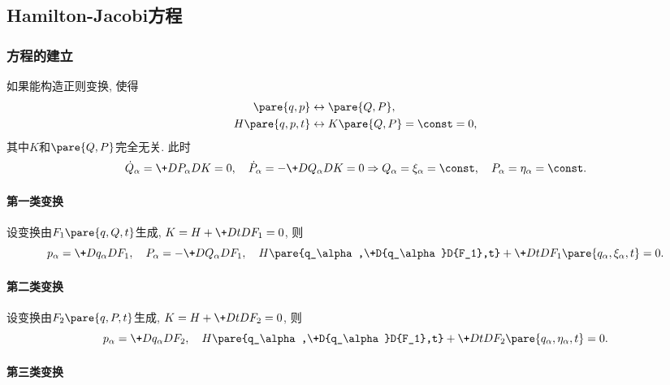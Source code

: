 \documentclass[../LectureNotes.tex]{subfiles}
\begin{document}


\subsection{Hamilton-Jacobi方程} %
\label{sub:hamilton_jacobi方程}

\subsubsection{方程的建立} %
\label{ssub:方程的建立}

如果能构造正则变换, 使得
\begin{align*}
    \pare{q,p} &\leftrightarrow \pare{Q,P}, \\
    H\pare{q,p,t} &\leftrightarrow K\pare{Q,P} = \const = 0,
\end{align*}
其中$K$和$\pare{Q,P}$完全无关. 此时
\[ \dot{Q}_\alpha = \+D{P_\alpha}DK = 0,\quad \dot{P}_\alpha = - \+D{Q_\alpha}DK = 0 \Rightarrow Q_\alpha = \xi_\alpha = \const,\quad P_\alpha = \eta_\alpha = \const. \]

\paragraph{第一类变换} %
\label{par:第一类变换}

设变换由$F_1\pare{q,Q,t}$生成, $K = H + \displaystyle \+DtD{F_1} = 0$, 则
\[ p_\alpha = \+D{q_\alpha}D{F_1},\quad P_\alpha = -\+D{Q_\alpha}D{F_1},\quad H\pare{q_\alpha,\+D{q_\alpha}D{F_1},t} + \+DtD{F_1\pare{q_\alpha,\xi_\alpha,t}} = 0. \]


\paragraph{第二类变换} %
\label{par:第二类变换}

设变换由$F_2\pare{q,P,t}$生成, $K = H + \displaystyle \+DtD{F_2} = 0$, 则
\[ p_\alpha = \+D{q_\alpha}D{F_2},\quad H\pare{q_\alpha,\+D{q_\alpha}D{F_1},t} + \+DtD{F_2\pare{q_\alpha,\eta_\alpha,t}} = 0. \]


\paragraph{第三类变换} %
\label{par:第三类变换}
\end{document}
